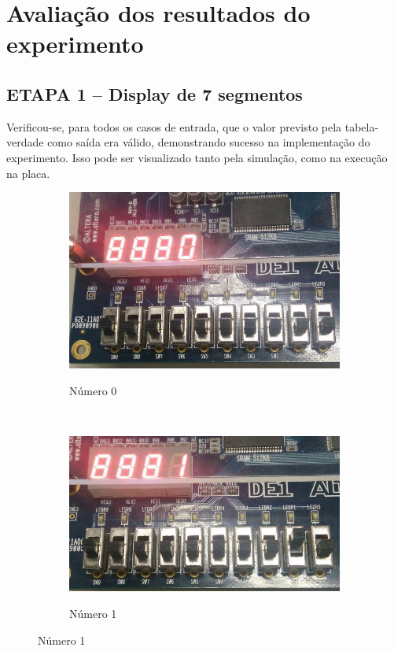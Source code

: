 \chapter{Avaliação dos resultados do experimento}
	\section{ETAPA 1 – Display de 7 segmentos}

		Verificou-se, para todos os casos de entrada, que o valor previsto pela tabela-verdade
		como saída era válido, demonstrando sucesso na implementação do experimento. Isso pode
		ser visualizado tanto pela simulação, como na execução na placa.

		\begin{figure}[H]
			\centering

			\begin{subfigure}[b]{0.44\textwidth}
				\includegraphics[width=\textwidth]{img/etapa1/0}
				\label{fig:etapa1-0}
				\caption{Número 0}
			\end{subfigure}
			~
			\begin{subfigure}[b]{0.44\textwidth}
				\includegraphics[width=\textwidth]{img/etapa1/1}
				\label{fig:etapa1-1}
				\caption{Número 1}
			\end{subfigure}


\end{figure}
